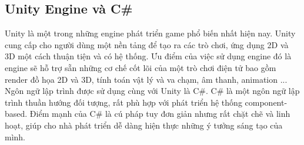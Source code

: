 \subsection{Unity Engine và C\#}
Unity là một trong những engine phát triển game phổ biến nhất hiện nay. Unity cung cấp cho người dùng một nền tảng để tạo ra các trò chơi, ứng dụng 2D và 3D một cách thuận tiện và có hệ thống. Ưu điểm của việc sử dụng engine đó là engine sẽ hỗ trợ sẵn những cơ chế cốt lõi của một trò chơi điện tử bao gồm render đồ họa 2D và 3D, tính toán vật lý và va chạm, âm thanh, animation ...\\
Ngôn ngữ lập trình được sử dụng cùng với Unity là C\#. C\# là một ngôn ngữ lập trình thuần hướng đối tượng, rất phù hợp với phát triển hệ thống component-based. Điểm mạnh của C\# là cú pháp tuy đơn giản nhưng rất chặt chẽ và linh hoạt, giúp cho nhà phát triển dễ dàng hiện thực những ý tưởng sáng tạo của mình.\\